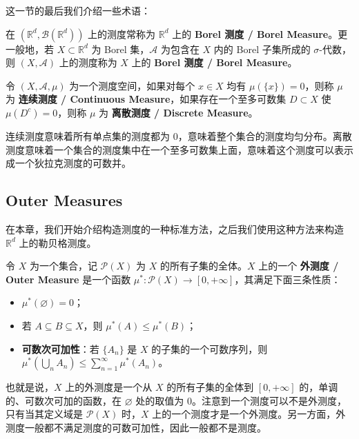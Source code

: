 \documentclass[11pt]{article}
\newcommand{\RR}{\mathbb{R}}
\newcommand{\calA}{\mathcal{A}}
\newcommand{\calB}{\mathcal{B}}
\newcommand{\calP}{\mathcal{P}}
\newcommand{\diam}{\varnothing}
\begin{document}
这一节的最后我们介绍一些术语：

\begin{definition}
    在 $(\RR^d,\calB(\RR^d))$ 上的测度常称为 $\RR^d$ 上的 {\normalfont\bfseries Borel 测度 / Borel Measure}。更一般地，若 $X \subset \RR^d$ 为 Borel 集，$\calA$ 为包含在 $X$ 内的 Borel 子集所成的 $\sigma$-代数，则 $(X,\calA)$ 上的测度称为 $X$ 上的 {\normalfont\bfseries Borel 测度 / Borel Measure}。
\end{definition}

\begin{definition}
    令 $(X,\calA,\mu)$ 为一个测度空间，如果对每个 $x \in X$ 均有 $\mu(\{x\})=0$，则称 $\mu$ 为 {\normalfont\bfseries 连续测度 / Continuous Measure}，如果存在一个至多可数集 $D \subset X$ 使 $\mu(D^c)=0$，则称 $\mu$ 为 {\normalfont\bfseries 离散测度 / Discrete Measure}。
\end{definition}

连续测度意味着所有单点集的测度都为 0，意味着整个集合的测度均匀分布。离散测度意味着一个集合的测度集中在一个至多可数集上面，意味着这个测度可以表示成一个狄拉克测度的可数并。

\clearpage

\subsection{Outer Measures}

在本章，我们开始介绍构造测度的一种标准方法，之后我们使用这种方法来构造 $\RR^d$ 上的勒贝格测度。

\begin{definition}
    令 $X$ 为一个集合，记 $\calP(X)$ 为 $X$ 的所有子集的全体。$X$ 上的一个 {\normalfont\bfseries 外测度 / Outer Measure} 是一个函数 $\mu^*:\calP(X) \to [0,+\infty]$，其满足下面三条性质：
    \begin{itemize}
        \item $\mu^*(\diam)=0$；
        \item 若 $A \subseteq B \subseteq X$，则 $\mu^*(A) \le \mu^*(B)$；
        \item {\normalfont\bfseries 可数次可加性}：若 $\{A_n\}$ 是 $X$ 的子集的一个可数序列，则 $\mu^*\left(\bigcup_n A_n\right) \le \sum_{n=1}^{\infty} \mu^*(A_n)$。
    \end{itemize}
\end{definition}

也就是说，$X$ 上的外测度是一个从 $X$ 的所有子集的全体到 $[0,+\infty]$ 的，单调的、可数次可加的函数，在 $\diam$ 处的取值为 $0$。注意到一个测度可以不是外测度，只有当其定义域是 $\calP(X)$ 时，$X$ 上的一个测度才是一个外测度。另一方面，外测度一般都不满足测度的可数可加性，因此一般都不是测度。
\end{document}
